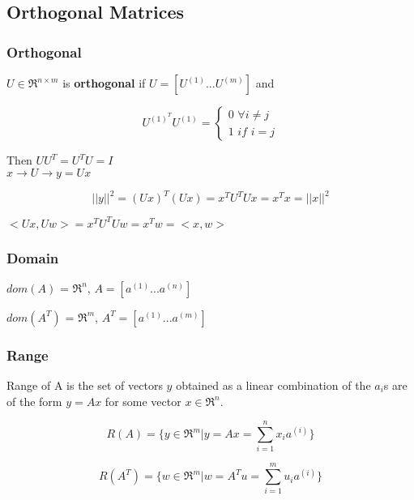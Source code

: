 \subsection{Orthogonal Matrices}

\subsubsection{Orthogonal}

\begin{definition}
	$U\in \Re^{n\times m}$ is \textbf{orthogonal} if $U = [U^{(1)} ... U^{(m)}]$
	and 
	
	$$ U^{(1)^T}U^{(1)}=\left\{
	\begin{aligned}
	0\,\, \forall i\neq j \\
	1\,\, if \,\, i = j
	\end{aligned}
	\right.
	$$
\end{definition}

Then $UU^T = U^TU = I$\\


$x\rightarrow U \rightarrow y = Ux$

\begin{equation*}
||y||^2 = (Ux)^T(Ux) = x^TU^TUx = x^Tx = ||x||^2
\end{equation*}

$<Ux, Uw> = x^TU^TUw = x^Tw = <x, w>$

\subsubsection{Domain}

$dom(A)$ = $\Re^n$, $A = [a^{(1)}...a^{(n)}]$

$dom(A^T)$ = $\Re^m$, $A^T = [a^{(1)}...a^{(m)}]$


\subsubsection{Range}

Range of A is the set of vectors $y$ obtained as a linear combination of the $a_i$s are of the form $y= Ax$ for some vector $x\in \Re^n$.

\begin{equation*}
R(A) = \{y\in \Re^m | y = Ax = \sum^n_{i=1}x_ia^{(i)}\}
\end{equation*}

\begin{equation*}
R(A^T) = \{w\in \Re^m | w = A^Tu = \sum^m_{i=1}u_ia^{(i)}\}
\end{equation*}

